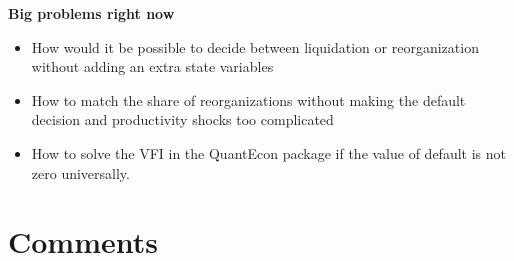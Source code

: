\documentclass[12pt]{article}
\begin{document}
\textbf{Big problems right now}
\begin{itemize}
    \item How would it be possible to decide between liquidation or reorganization without adding an extra state variables
    \item How to match the share of reorganizations without making the default decision and productivity shocks too complicated
    \item How to solve the VFI in the QuantEcon package if the value of default is not zero universally.
\end{itemize}
 
\newpage

\section*{Comments}
\end{document}
